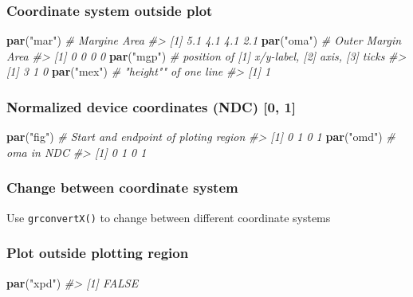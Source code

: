 \documentclass[]{book}
\newenvironment{Shaded}{\begin{snugshade}}{\end{snugshade}}
\newcommand{\KeywordTok}[1]{\textcolor[rgb]{0.13,0.29,0.53}{\textbf{#1}}}
\newcommand{\StringTok}[1]{\textcolor[rgb]{0.31,0.60,0.02}{#1}}
\newcommand{\CommentTok}[1]{\textcolor[rgb]{0.56,0.35,0.01}{\textit{#1}}}
\newcommand{\NormalTok}[1]{#1}
\begin{document}
\subsubsection{Coordinate system outside
plot}\label{coordinate-system-outside-plot}

\begin{Shaded}
\begin{Highlighting}[]
\KeywordTok{par}\NormalTok{(}\StringTok{"mar"}\NormalTok{) }\CommentTok{# Margine Area}
\CommentTok{#> [1] 5.1 4.1 4.1 2.1}
\KeywordTok{par}\NormalTok{(}\StringTok{"oma"}\NormalTok{) }\CommentTok{# Outer Margin Area}
\CommentTok{#> [1] 0 0 0 0}
\KeywordTok{par}\NormalTok{(}\StringTok{"mgp"}\NormalTok{) }\CommentTok{# position of [1] x/y-label, [2] axis, [3] ticks}
\CommentTok{#> [1] 3 1 0}
\KeywordTok{par}\NormalTok{(}\StringTok{"mex"}\NormalTok{) }\CommentTok{# "height"" of one line}
\CommentTok{#> [1] 1}
\end{Highlighting}
\end{Shaded}

\subsubsection{Normalized device coordinates (NDC) {[}0,
1{]}}\label{normalized-device-coordinates-ndc-0-1}

\begin{Shaded}
\begin{Highlighting}[]
\KeywordTok{par}\NormalTok{(}\StringTok{"fig"}\NormalTok{) }\CommentTok{# Start and endpoint of ploting region}
\CommentTok{#> [1] 0 1 0 1}
\KeywordTok{par}\NormalTok{(}\StringTok{"omd"}\NormalTok{) }\CommentTok{# oma in NDC}
\CommentTok{#> [1] 0 1 0 1}
\end{Highlighting}
\end{Shaded}

\subsubsection{Change between coordinate
system}\label{change-between-coordinate-system}

Use \texttt{grconvertX()} to change between different coordinate systems

\subsubsection{Plot outside plotting
region}\label{plot-outside-plotting-region}

\begin{Shaded}
\begin{Highlighting}[]
\KeywordTok{par}\NormalTok{(}\StringTok{"xpd"}\NormalTok{)}
\CommentTok{#> [1] FALSE}
\end{Highlighting}
\end{Shaded}
\end{document}
